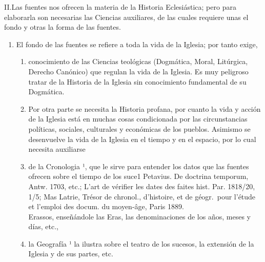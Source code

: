 \raggedbottom{} \documentclass[12pt, a4paper]{book}
\begin{document}
II.\@ Las fuentes nos ofrecen la materia de la Historia Eclesiástica; pero para elaborarla son necesarias las Ciencias auxiliares, de las cuales requiere unas el fondo y otras la forma de las fuentes.
\begin{enumerate}
  \item El fondo de las fuentes se refiere a toda la vida de la Iglesia;
        por tanto exige,\begin{enumerate}
          \item conocimiento de las Ciencias teológicas (Dogmática, Moral, Litúrgica, Derecho Canónico) que regulan la vida de la Iglesia. Es muy peligroso tratar de la Historia de la Iglesia sin conocimiento fundamental de su Dogmática.
          \item Por otra parte se necesita la Historia profana, por cuanto la vida y acción de la Iglesia está en muchas cosas condicionada por las circunstancias políticas, sociales, culturales y económicas de los pueblos. Asimismo se desenvuelve la vida de la Iglesia en el tiempo y en el espacio, por lo cual necesita auxiliarse
          \item de la Cronologia ¹, que le sirve para entender los datos que las fuentes ofrecen sobre el tiempo de los suce1 Petavius. De doctrina temporum, Antw. 1703, etc.; L'art de vérifier les dates des faites hist. Par. 1818/20, 1/5; Mas Latrie, Trésor de chronol., d'histoire, et de géogr.\ pour l'étude et l'emploi des docum. du moyen-âge, Paris 1889.\\ Erassos, enseñándole las Eras, las denominaciones de los años, meses y días, etc., 
          \item la Geografía ¹ la ilustra sobre el teatro de los sucesos, la extensión de la Iglesia y de sus partes, etc.



\end{enumerate}
\end{enumerate}
\end{document}
